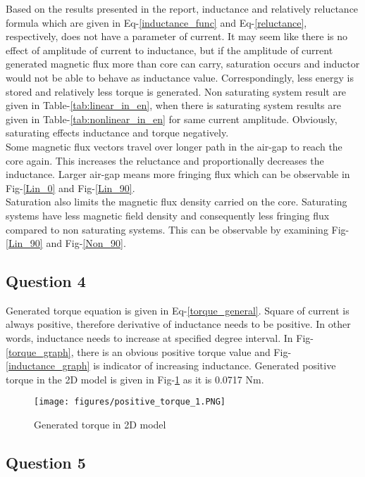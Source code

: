 \documentclass[11pt, a4paper]{article}
\begin{document}
Based on the results presented in the report, inductance and relatively reluctance formula which are given in Eq-\ref{inductance_func} and Eq-\ref{reluctance}, respectively, does not  have a parameter of current. It may seem like there is no effect of amplitude of current to inductance, but if the amplitude of current generated  magnetic flux more than core can carry, saturation occurs and inductor would not be able to behave as inductance value. Correspondingly, less energy is stored and relatively less torque is generated. Non saturating system result are given in Table-\ref{tab:linear_in_en}, when there is saturating system results are given in Table-\ref{tab:nonlinear_in_en} for same current amplitude. Obviously, saturating effects inductance and torque negatively.\\

Some magnetic flux vectors travel over longer path in the air-gap to reach the core again. This increases the reluctance and proportionally decreases the inductance. Larger air-gap means more fringing flux which can be observable in Fig-\ref{Lin_0} and Fig-\ref{Lin_90}.\\

Saturation also limits the magnetic flux density carried on the core. Saturating systems have less magnetic field density and consequently less fringing flux compared to non saturating systems. This can be observable by examining Fig-\ref{Lin_90} and Fig-\ref{Non_90}.

\subsection*{Question 4}

Generated torque equation is given in Eq-\ref{torque_general}. Square of current is always positive, therefore derivative of inductance needs to be positive. In other words, inductance needs to increase at specified degree interval. In Fig-\ref{torque_graph}, there is an obvious positive torque value and Fig-\ref{inductance_graph} is indicator of increasing inductance. Generated positive torque in the 2D model is given in Fig-\ref{positive_torque} as it is 0.0717 Nm.

\begin{figure}[ht]
\centering
\texttt{[image: figures/positive\_torque\_1.PNG]}
\caption{Generated torque in 2D model} 
\label{positive_torque}
\end{figure}

\subsection*{Question 5}
\end{document}
